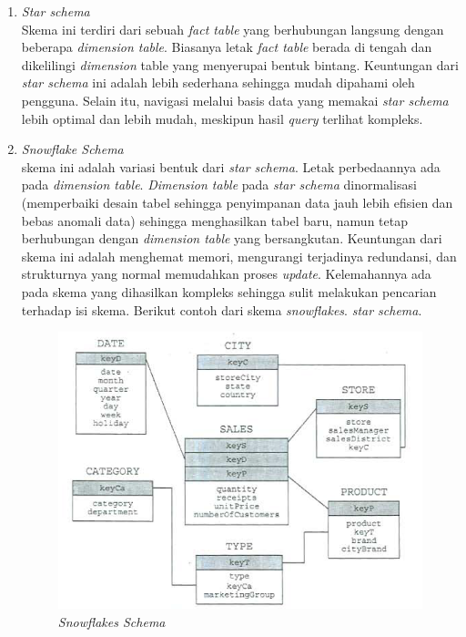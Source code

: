 \begin{enumerate}
	\item \textit{Star schema}\\
	Skema ini terdiri dari sebuah \textit{fact table} yang berhubungan langsung dengan beberapa \textit{dimension table}. Biasanya letak \textit{fact table} berada di tengah dan dikelilingi \textit{dimension} table yang menyerupai bentuk bintang. Keuntungan dari \textit{star schema} ini adalah lebih sederhana sehingga mudah dipahami oleh pengguna. Selain itu, navigasi melalui basis data yang memakai \textit{star schema} lebih optimal dan lebih mudah, meskipun hasil \textit{query} terlihat kompleks.\cite{Matteo:2009}
\item \textit{Snowflake Schema}\\
skema ini adalah variasi bentuk dari \textit{star schema}. Letak perbedaannya ada pada \textit{dimension table}. \textit{Dimension table} pada \textit{star schema} dinormalisasi (memperbaiki desain tabel sehingga penyimpanan data jauh lebih efisien dan bebas anomali data) sehingga menghasilkan tabel baru, namun tetap berhubungan dengan \textit{dimension table} yang bersangkutan. Keuntungan dari skema ini adalah menghemat memori, mengurangi terjadinya redundansi, dan strukturnya yang normal memudahkan proses \textit{update}. Kelemahannya ada pada skema yang dihasilkan kompleks sehingga sulit melakukan pencarian terhadap isi skema. Berikut contoh dari skema \textit{snowflakes}.
  \textit{star schema}.\cite{Matteo:2009}
	\begin{figure}[h]
	\centering
	\includegraphics[scale=0.65]{Gambar/snowflakes-schema}
	\caption{\textit{Snowflakes Schema}\cite{Matteo:2009}}
	\end{figure}
	

\end{enumerate}
